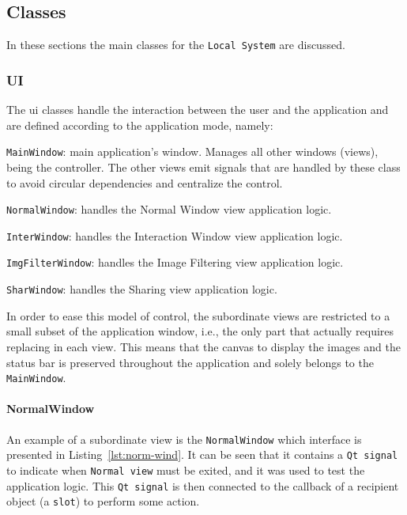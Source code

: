 

\subsection{Classes}
\label{sec:classes}
In these sections the main classes for the \texttt{Local System} are discussed.

\subsubsection{UI}
\label{sec:ui}
The \gls{ui} classes handle the interaction between the user and the application
and are defined according to the application mode, namely:
\begin{item-c}
\item \texttt{MainWindow}: main application's window. Manages all other windows
  (views), being the controller. The other views emit signals that are handled
  by these class to avoid circular dependencies and centralize the control.
\item \texttt{NormalWindow}: handles the Normal Window view application logic.
\item \texttt{InterWindow}: handles the Interaction Window view application logic.
\item \texttt{ImgFilterWindow}: handles the Image Filtering view application
  logic.
\item \texttt{SharWindow}: handles the Sharing view application logic.
\end{item-c}

In order to ease this model of control, the subordinate views are restricted to
a small subset of the application window, i.e., the only part that actually
requires replacing in each view. This means that the canvas to display the
images and the status bar is preserved throughout the application and solely
belongs to the \texttt{MainWindow}.

\paragraph{\textbf{NormalWindow}}
An example of a subordinate view is the \texttt{NormalWindow} which interface is
presented in Listing~\ref{lst:norm-wind}. It can be seen that it contains
a \texttt{Qt signal} to indicate when \texttt{Normal view} must be exited, and
it was used to test the application logic. This \texttt{Qt signal} is then
connected to the callback of a recipient object (a \texttt{slot}) to perform
some action.

